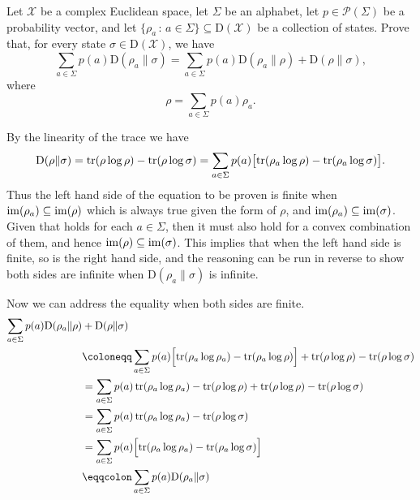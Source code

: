 \documentclass[boxes,pages,color=SeaGreen]{homework}
\newcommand{\X}{\mathcal{X}}
\renewcommand{\P}{\mathcal{P}}
\newcommand{\Density}{\mathrm{D}}
\newcommand{\relEn}{\mathrm{D}}
\begin{document}

\begin{problem}
Let $\X$ be a complex Euclidean space,
let $\Sigma$ be an alphabet,
let $p\in\P(\Sigma)$ be a probability vector, and
let $\{\rho_a\,:\,a\in\Sigma\}\subseteq\Density(\X)$ be a collection of
states.
Prove that, for every state $\sigma\in\Density(\X)$, we have
\[
    \sum_{a\in\Sigma} p(a) \mathrm{D}(\rho_a \| \sigma)
    = \sum_{a\in\Sigma} p(a) \mathrm{D}(\rho_a \| \rho) +
    \mathrm{D}(\rho \| \sigma),
\]
where
\[
    \rho = \sum_{a\in\Sigma} p(a) \rho_a.
\]
\end{problem}

\begin{solution}
    By the linearity of the trace we have
    \begin{align*}
        \relEn(\rho \| \sigma) = \tr(\rho\log\rho) - \tr(\rho\log\sigma) = \sum_{a\in\Sigma}p(a)\qty\big[\tr(\rho_a\log\rho) - \tr(\rho_a\log\sigma)].
    \end{align*} %
    Thus the left hand side of the equation to be proven is finite when $\operatorname{im}(\rho_a) \subseteq \operatorname{im}(\rho)$ which is always true given the form of $\rho$, and $\operatorname{im}(\rho_a) \subseteq \operatorname{im}(\sigma)$. Given that holds for each $a \in \Sigma$, then it must also hold for a convex combination of them, and hence $\operatorname{im}(\rho) \subseteq \operatorname{im}(\sigma)$.
    This implies that when the left hand side is finite, so is the right hand side, and the reasoning can be run in reverse to show both sides are infinite when $\mathrm{D}(\rho_a \| \sigma)$ is infinite.

    Now we can address the equality when both sides are finite.
    \begin{align*}
        \sum_{a\in\Sigma} p(a) \mathrm{D}(\rho_a \| \rho) & + \mathrm{D}(\rho \| \sigma)                                                                                                  \\
                                                          & \defeq \sum_{a\in\Sigma} p(a) \qty\Big[\tr(\rho_a\log\rho_a) - \tr(\rho_a\log\rho)] + \tr(\rho\log\rho) - \tr(\rho\log\sigma) \\
                                                          & = \sum_{a\in\Sigma} p(a) \tr(\rho_a\log\rho_a) - \tr(\rho\log\rho) + \tr(\rho\log\rho) - \tr(\rho\log\sigma)                  \\
                                                          & = \sum_{a\in\Sigma} p(a) \tr(\rho_a\log\rho_a) - \tr(\rho\log\sigma)                                                          \\
                                                          & = \sum_{a\in\Sigma} p(a) \qty\Big[\tr(\rho_a\log\rho_a) - \tr(\rho_a\log\sigma)]                                              \\
                                                          & \eqdef \sum_{a\in\Sigma} p(a) \mathrm{D}(\rho_a \| \sigma)
    \end{align*}

\end{solution}
\end{document}
